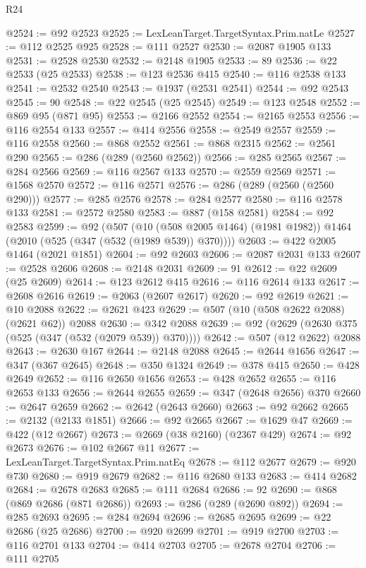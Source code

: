 \begin{lexlean}{R24}
\begin{coremodule}
@2524 := @92 @2523
@2525 := LexLeanTarget.TargetSyntax.Prim.natLe
@2527 := @112 @2525 @925
@2528 := @111 @2527
@2530 := @2087 @1905 @133
@2531 := @2528 @2530
@2532 := @2148 @1905
@2533 := 89
@2536 := @22 @2533 (@25 @2533)
@2538 := @123 @2536 @415
@2540 := @116 @2538 @133
@2541 := @2532 @2540
@2543 := @1937 (@2531 @2541)
@2544 := @92 @2543
@2545 := 90
@2548 := @22 @2545 (@25 @2545)
@2549 := @123 @2548
@2552 := @869 @95 (@871 @95)
@2553 := @2166 @2552
@2554 := @2165 @2553
@2556 := @116 @2554 @133
@2557 := @414 @2556
@2558 := @2549 @2557
@2559 := @116 @2558
@2560 := @868 @2552
@2561 := @868 @2315
@2562 := @2561 @290
@2565 := @286 (@289 (@2560 @2562))
@2566 := @285 @2565
@2567 := @284 @2566
@2569 := @116 @2567 @133
@2570 := @2559 @2569
@2571 := @1568 @2570
@2572 := @116 @2571
@2576 := @286 (@289 (@2560 (@2560 @290)))
@2577 := @285 @2576
@2578 := @284 @2577
@2580 := @116 @2578 @133
@2581 := @2572 @2580
@2583 := @887 (@158 @2581)
@2584 := @92 @2583
@2599 := @92
    (@507
      (@10 (@508 @2005 @1464) (@1981 @1982))
      @1464
      (@2010 (@525 (@347 (@532 (@1989 @539)) @370))))
@2603 := @422 @2005 @1464 (@2021 @1851)
@2604 := @92 @2603
@2606 := @2087 @2031 @133
@2607 := @2528 @2606
@2608 := @2148 @2031
@2609 := 91
@2612 := @22 @2609 (@25 @2609)
@2614 := @123 @2612 @415
@2616 := @116 @2614 @133
@2617 := @2608 @2616
@2619 := @2063 (@2607 @2617)
@2620 := @92 @2619
@2621 := @10 @2088
@2622 := @2621 @423
@2629 := @507 (@10 (@508 @2622 @2088) (@2621 @62)) @2088
@2630 := @342 @2088
@2639 := @92 (@2629 (@2630 @375 (@525 (@347 (@532 (@2079 @539)) @370))))
@2642 := @507 (@12 @2622) @2088
@2643 := @2630 @167
@2644 := @2148 @2088
@2645 := @2644 @1656
@2647 := @347 (@367 @2645)
@2648 := @350 @1324
@2649 := @378 @415
@2650 := @428 @2649
@2652 := @116 @2650 @1656
@2653 := @428 @2652
@2655 := @116 @2653 @133
@2656 := @2644 @2655
@2659 := @347 (@2648 @2656) @370
@2660 := @2647 @2659
@2662 := @2642 (@2643 @2660)
@2663 := @92 @2662
@2665 := @2132 (@2133 @1851)
@2666 := @92 @2665
@2667 := @1629 @47
@2669 := @422 (@12 @2667)
@2673 := @2669 (@38 @2160) (@2367 @429)
@2674 := @92 @2673
@2676 := @102 @2667 @11
@2677 := LexLeanTarget.TargetSyntax.Prim.natEq
@2678 := @112 @2677
@2679 := @920 @730
@2680 := @919 @2679
@2682 := @116 @2680 @133
@2683 := @414 @2682
@2684 := @2678 @2683
@2685 := @111 @2684
@2686 := 92
@2690 := @868 (@869 @2686 (@871 @2686))
@2693 := @286 (@289 (@2690 @892))
@2694 := @285 @2693
@2695 := @284 @2694
@2696 := @2685 @2695
@2699 := @22 @2686 (@25 @2686)
@2700 := @920 @2699
@2701 := @919 @2700
@2703 := @116 @2701 @133
@2704 := @414 @2703
@2705 := @2678 @2704
@2706 := @111 @2705

\end{coremodule}
\end{lexlean}
